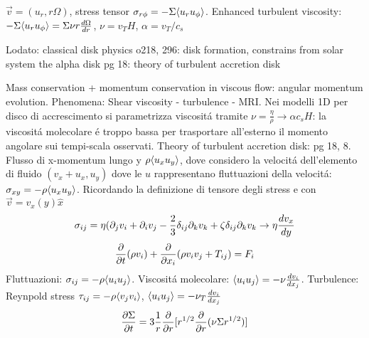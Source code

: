 \begin{workout}
	$\vec{v}=(u_r,r\Omega)$, stress tensor $\sigma_{r\phi}=-\Sigma\exv{u_ru_{\phi}}$.
	Enhanced turbulent viscosity: $-\Sigma\exv{u_ru_{\phi}}=\Sigma\nu r\TDy{r}{\Omega}$, $\nu=v_TH$, $\alpha=v_T/c_s$
\end{workout}

\begin{workout}
	Lodato: classical disk physics
	o218, 296: disk formation, constrains from solar system
	the alpha disk pg 18: theory of turbulent accretion disk
\end{workout}

\begin{workout}
	
\end{workout}

\begin{workout}
	Mass conservation + momentum conservation in viscous flow: angular momentum evolution. Phenomena: Shear viscosity - turbulence - MRI.
	Nei modelli 1D per disco di accrescimento si parametrizza viscosit\'a tramite $\nu=\frac{\eta}{\rho}\to\alpha c_s H$: la viscosit\'a molecolare \'e troppo bassa  per trasportare all'esterno il momento angolare sui tempi-scala osservati.
	Theory of turbulent accretion disk: pg 18, 8.
	Flusso di x-momentum lungo y $\rho\exv{u_xu_y}$, dove considero la velocit\'a dell'elemento di fluido $(v_x+u_x,u_y)$ dove le $u$ rappresentano fluttuazioni della velocit\'a: $\sigma_{xy}=-\rho\exv{u_xu_y}$.
	Ricordando la definizione di tensore degli stress e con $\vec{v}=v_x(y)\hat{x}$
	\begin{equation}
	\sigma_{ij}=\eta(\partial_jv_i+\partial_iv_j-\frac{2}{3}\delta_{ij}\partial_kv_k+\zeta\delta_{ij}\partial_kv_k \to \eta\TDy{y}{v_x}
	\end{equation}
	\begin{equation}
	\PDof{t}(\rho v_i)+\PDof{x_i}(\rho v_iv_j+T_{ij})=F_i
	\end{equation}
	Fluttuazioni: $\sigma_{ij}=-\rho\exv{u_iu_j}$.
	Viscosit\'a molecolare: $\exv{u_iu_j}=-\nu\TDy{x_j}{v_i}$.
	Turbulence: Reynpold stress $\tau_{ij}=-\rho\exv{v_jv_i}$, $\exv{u_iu_j}=-\nu_T\TDy{x_j}{v_i}$
	\begin{equation}
	\PDy{t}{\Sigma}=3\frac{1}{r}\PDof{r}[r\expy{1/2}\PDof{r}(\nu\Sigma r\expy{1/2})]
	\end{equation}
\end{workout}

